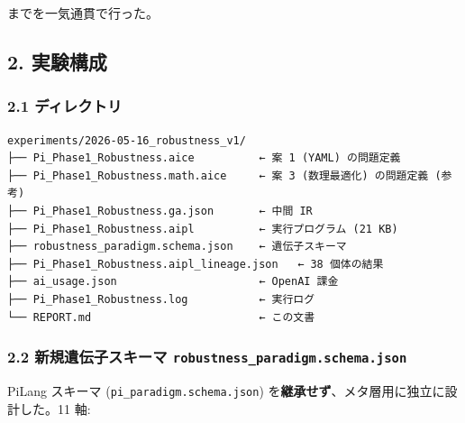 \documentclass[
]{ltjsarticle}
\begin{document}
までを一気通貫で行った。

\subsection{2. 実験構成}\label{ux5b9fux9a13ux69cbux6210}

\subsubsection{2.1
ディレクトリ}\label{ux30c7ux30a3ux30ecux30afux30c8ux30ea}

\begin{verbatim}
experiments/2026-05-16_robustness_v1/
├── Pi_Phase1_Robustness.aice          ← 案 1 (YAML) の問題定義
├── Pi_Phase1_Robustness.math.aice     ← 案 3 (数理最適化) の問題定義 (参考)
├── Pi_Phase1_Robustness.ga.json       ← 中間 IR
├── Pi_Phase1_Robustness.aipl          ← 実行プログラム (21 KB)
├── robustness_paradigm.schema.json    ← 遺伝子スキーマ
├── Pi_Phase1_Robustness.aipl_lineage.json   ← 38 個体の結果
├── ai_usage.json                      ← OpenAI 課金
├── Pi_Phase1_Robustness.log           ← 実行ログ
└── REPORT.md                          ← この文書
\end{verbatim}

\subsubsection{\texorpdfstring{2.2 新規遺伝子スキーマ
\texttt{robustness\_paradigm.schema.json}}{2.2 新規遺伝子スキーマ robustness\_paradigm.schema.json}}\label{ux65b0ux898fux907aux4f1dux5b50ux30b9ux30adux30fcux30de-robustness_paradigm.schema.json}

PiLang スキーマ (\texttt{pi\_paradigm.schema.json})
を\textbf{継承せず}、メタ層用に独立に設計した。11 軸:
\end{document}
